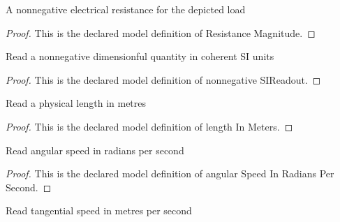 \begin{definition}
  \label{def:physics:phyx-mini-0920:phyxminiproblems-problemphyxmini0920-resistancemagnitude}
  A nonnegative electrical resistance for the depicted load
\end{definition}
\begin{proof}
  This is the declared model definition of Resistance Magnitude.
\end{proof}
\begin{definition}
  \label{def:physics:phyx-mini-0920:phyxminiproblems-problemphyxmini0920-nonnegativesireadout}
  Read a nonnegative dimensionful quantity in coherent SI units
\end{definition}
\begin{proof}
  This is the declared model definition of nonnegative SIReadout.
\end{proof}
\begin{definition}
  \label{def:physics:phyx-mini-0920:phyxminiproblems-problemphyxmini0920-lengthinmeters}
  Read a physical length in metres
\end{definition}
\begin{proof}
  This is the declared model definition of length In Meters.
\end{proof}
\begin{definition}
  \label{def:physics:phyx-mini-0920:phyxminiproblems-problemphyxmini0920-angularspeedinradianspersecond}
  Read angular speed in radians per second
\end{definition}
\begin{proof}
  This is the declared model definition of angular Speed In Radians Per Second.
\end{proof}
\begin{definition}
  \label{def:physics:phyx-mini-0920:phyxminiproblems-problemphyxmini0920-speedinmeterspersecond}
  Read tangential speed in metres per second
\end{definition}

